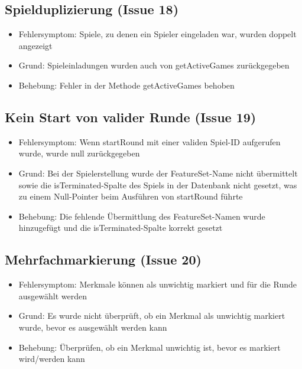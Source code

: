 \documentclass[a4paper]{scrreprt}
\begin{document}
    \subsection{Spielduplizierung (Issue 18)}
    \begin{itemize}
        \item Fehlersymptom: Spiele, zu denen ein Spieler eingeladen war, wurden doppelt angezeigt
        \item Grund: Spieleinladungen wurden auch von getActiveGames zurückgegeben
        \item Behebung: Fehler in der Methode getActiveGames behoben
    \end{itemize}

    \subsection{Kein Start von valider Runde (Issue 19)}
    \begin{itemize}
        \item Fehlersymptom: Wenn startRound mit einer validen Spiel-ID aufgerufen wurde, wurde null zurückgegeben
        \item Grund: Bei der Spielerstellung wurde der FeatureSet-Name nicht übermittelt sowie die isTerminated-Spalte des Spiels
        in der Datenbank nicht gesetzt, was zu einem Null-Pointer beim Ausführen von startRound führte
        \item Behebung: Die fehlende Übermittlung des FeatureSet-Namen wurde hinzugefügt und die isTerminated-Spalte korrekt gesetzt
    \end{itemize}

    \subsection{Mehrfachmarkierung (Issue 20)}
    \begin{itemize}
        \item Fehlersymptom: Merkmale können als unwichtig markiert und für die Runde ausgewählt werden
        \item Grund: Es wurde nicht überprüft, ob ein Merkmal als unwichtig markiert wurde, bevor es ausgewählt werden kann
        \item Behebung: Überprüfen, ob ein Merkmal unwichtig ist, bevor es markiert wird/werden kann
    \end{itemize}
\end{document}
